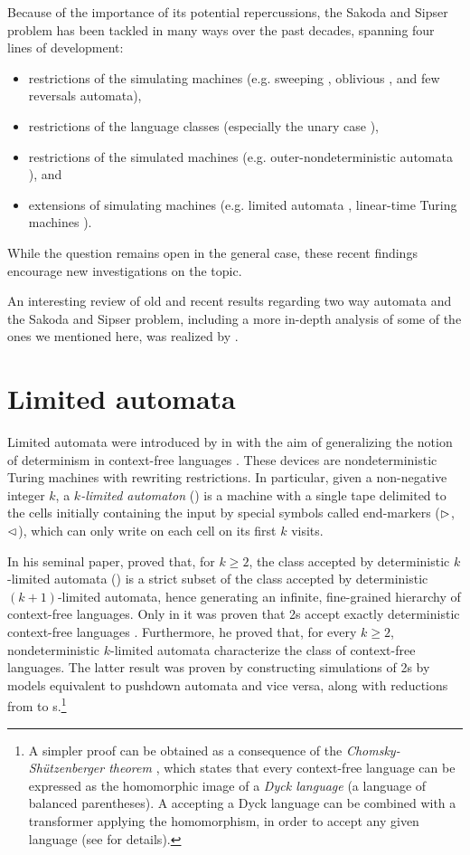 Because of the importance of its potential repercussions, the Sakoda and Sipser problem has been tackled in many ways over the past decades, spanning four lines of development:
\begin{itemize}
	\item restrictions of the simulating machines (e.g. sweeping \cite{Sip80}, oblivious \cite{HroSch03}, and few reversals \cite{Kap13} automata),
	\item restrictions of the language classes (especially the unary case \cite{GefMer+07}),
	\item restrictions of the simulated machines (e.g. outer-nondeterministic automata \cite{GefGui+14,KapPig15}), and
	\item extensions of simulating machines (e.g. limited automata \cite{PigPis14,PigPri19,GuiPri19,PigPri+22}, linear-time Turing machines \cite{Pru14,GuiPig+18,Hen65,GuiPig+23,Har68}).
\end{itemize}
While the question remains open in the general case, these recent findings encourage new investigations on the topic.

An interesting review of old and recent results regarding two way automata and the Sakoda and Sipser problem, including a more in-depth analysis of some of the ones we mentioned here, was realized by .


\section{Limited automata}
Limited automata were introduced by  in \citeyear{Hib67} with the aim of generalizing the notion of determinism in context-free languages \cite{Hib67}.
These devices are nondeterministic Turing machines with rewriting restrictions.
In particular, given a non-negative integer $k$, a \emph{$k$-limited automaton} (\kLA) is a machine with a single tape delimited to the cells initially containing the input by special symbols called end-markers ($\rhd$,$\lhd$), which can only write on each cell on its first $k$ visits.

In his seminal paper, \citeauthor{Hib67} proved that, for $k\ge2$, the class accepted by deterministic $k$-limited automata (\kDLAs) is a strict subset of the class accepted by deterministic $(k+1)$-limited automata, hence generating an infinite, fine-grained hierarchy of context-free languages.
Only in \citeyear{PigPis15} it was proven that \DLA2s accept exactly deterministic context-free languages \cite{PigPis15}.
Furthermore, he proved that, for every $k\ge2$, nondeterministic $k$-limited automata characterize the class of context-free languages.
The latter result was proven by constructing simulations of \LA2s by models equivalent to pushdown automata and vice versa, along with reductions from \kLAs to s.\footnote{%
	A simpler proof can be obtained as a consequence of the \emph{Chomsky-Shützenberger theorem} \cite{ChoSch63}, which states that every context-free language can be expressed as the homomorphic image of a \emph{Dyck language} (a language of balanced parentheses).
	A  accepting a Dyck language can be combined with a transformer applying the homomorphism, in order to accept any given language (see \cite{Pig19} for details).}

